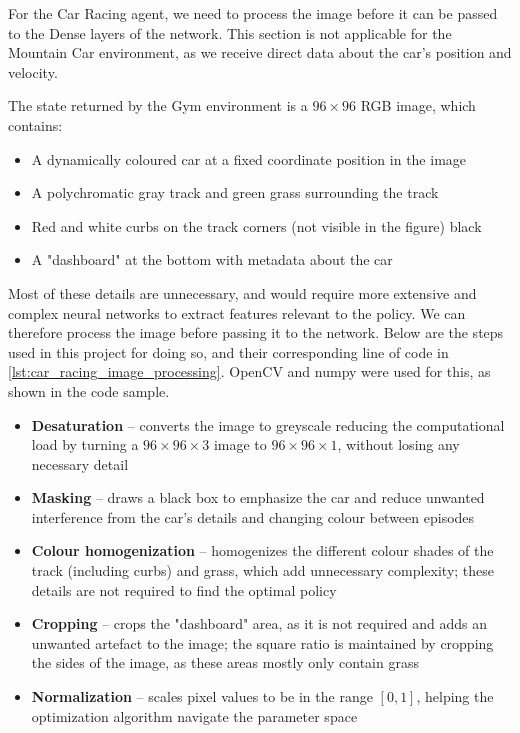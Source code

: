 For the Car Racing agent, we need to process the image before it can be passed
to the Dense layers of the network. This section is not applicable for the
Mountain Car environment, as we receive direct data about the car's position
and velocity.

The state returned by the Gym environment is a $96\times 96$ RGB image, which
contains:

\begin{itemize}
  \item A dynamically coloured car at a fixed coordinate position in the image
  \item A polychromatic gray track and green grass surrounding the track
  \item Red and white curbs on the track corners (not visible in the figure) black
  \item A "dashboard" at the bottom with metadata about the car
\end{itemize}

Most of these details are unnecessary, and would require more extensive and
complex neural networks to extract features relevant to the policy. We can
therefore process the image before passing it to the network. Below are the
steps used in this project for doing so, and their corresponding line of code
in \autoref{lst:car_racing_image_processing}. OpenCV and numpy were used for
this, as shown in the code sample.

\begin{itemize}
  \item \textbf{Desaturation} -- converts the image to greyscale reducing the
        computational load by turning a $96\times 96\times 3$ image to $96\times
          96\times 1$, without losing any necessary detail
  \item \textbf{Masking} -- draws a black box to emphasize the car and
        reduce unwanted interference from the car's details and changing colour between
        episodes
  \item \textbf{Colour homogenization} -- homogenizes the different colour shades of
        the track (including curbs) and grass, which add unnecessary complexity; these
        details are not required to find the optimal policy
  \item \textbf{Cropping} -- crops the "dashboard" area, as it is not required and adds
        an unwanted artefact to the image; the square ratio is maintained by cropping
        the sides of the image, as these areas mostly only contain grass
  \item \textbf{Normalization} -- scales pixel values to be in the range $[0, 1]$,
        helping the optimization algorithm navigate the parameter space
\end{itemize}

